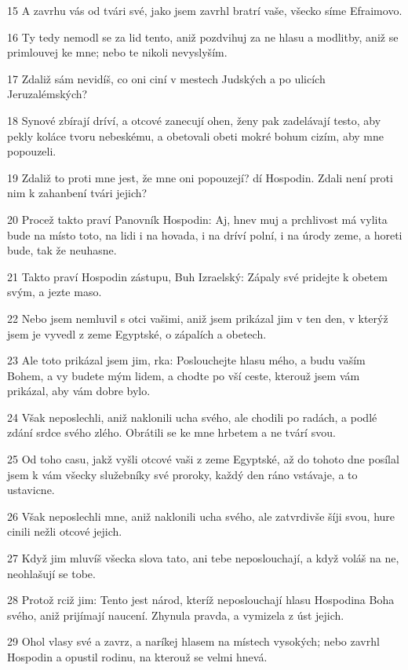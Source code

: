 \par 15 A zavrhu vás od tvári své, jako jsem zavrhl bratrí vaše, všecko síme Efraimovo.
\par 16 Ty tedy nemodl se za lid tento, aniž pozdvihuj za ne hlasu a modlitby, aniž se primlouvej ke mne; nebo te nikoli nevyslyším.
\par 17 Zdaliž sám nevidíš, co oni ciní v mestech Judských a po ulicích Jeruzalémských?
\par 18 Synové zbírají dríví, a otcové zanecují ohen, ženy pak zadelávají testo, aby pekly koláce tvoru nebeskému, a obetovali obeti mokré bohum cizím, aby mne popouzeli.
\par 19 Zdaliž to proti mne jest, že mne oni popouzejí? dí Hospodin. Zdali není proti nim k zahanbení tvári jejich?
\par 20 Procež takto praví Panovník Hospodin: Aj, hnev muj a prchlivost má vylita bude na místo toto, na lidi i na hovada, i na dríví polní, i na úrody zeme, a horeti bude, tak že neuhasne.
\par 21 Takto praví Hospodin zástupu, Buh Izraelský: Zápaly své pridejte k obetem svým, a jezte maso.
\par 22 Nebo jsem nemluvil s otci vašimi, aniž jsem prikázal jim v ten den, v kterýž jsem je vyvedl z zeme Egyptské, o zápalích a obetech.
\par 23 Ale toto prikázal jsem jim, rka: Poslouchejte hlasu mého, a budu vaším Bohem, a vy budete mým lidem, a chodte po vší ceste, kterouž jsem vám prikázal, aby vám dobre bylo.
\par 24 Však neposlechli, aniž naklonili ucha svého, ale chodili po radách, a podlé zdání srdce svého zlého. Obrátili se ke mne hrbetem a ne tvárí svou.
\par 25 Od toho casu, jakž vyšli otcové vaši z zeme Egyptské, až do tohoto dne posílal jsem k vám všecky služebníky své proroky, každý den ráno vstávaje, a to ustavicne.
\par 26 Však neposlechli mne, aniž naklonili ucha svého, ale zatvrdivše šíji svou, hure cinili nežli otcové jejich.
\par 27 Když jim mluvíš všecka slova tato, ani tebe neposlouchají, a když voláš na ne, neohlašují se tobe.
\par 28 Protož rciž jim: Tento jest národ, kteríž neposlouchají hlasu Hospodina Boha svého, aniž prijímají naucení. Zhynula pravda, a vymizela z úst jejich.
\par 29 Ohol vlasy své a zavrz, a naríkej hlasem na místech vysokých; nebo zavrhl Hospodin a opustil rodinu, na kterouž se velmi hnevá.
